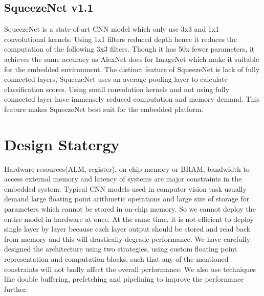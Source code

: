 \documentclass[conference]{IEEEtran}
\begin{document}
\subsection{SqueezeNet v1.1}
SqueezeNet is a state-of-art CNN model which only use 3x3 and 1x1 convolutional kernels. Using 1x1 filters reduced depth hence it reduces the computation of the following 3x3 filters. Though it has 50x fewer parameters, it achieves the same accuracy as AlexNet does for ImageNet which make it suitable for the embedded environment. The distinct feature of SqueezeNet is lack of fully connected layers, SqueezeNet uses an average pooling layer to calculate classification scores. Using small convolution kernels and not using fully connected layer have immensely reduced computation and memory demand. This feature makes SqueezeNet best suit for the embedded platform.


\section{Design Statergy}
Hardware resources(ALM, register), on-chip memory or BRAM, bandwidth to access external memory and latency of systems are major constraints in the embedded system. Typical CNN models used in computer vision task usually demand large floating point arithmetic operations and large size of storage for parameters which cannot be stored in on-chip memory. So we cannot deploy the entire model in hardware at once. At the same time, it is not efficient to deploy single layer by layer because each layer output should be stored and read back from memory and this will drastically degrade performance. We have carefully designed the architecture using two strategies, using custom floating point representation and computation blocks, such that any of the mentioned constraints will not badly affect the overall performance.  We also use techniques like double buffering, prefetching and pipelining to improve the performance further.
\end{document}
